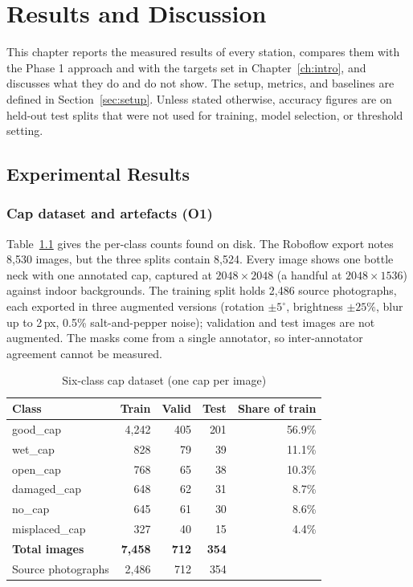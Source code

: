 \chapter{Results and Discussion}
\label{ch:results}

This chapter reports the measured results of every station, compares them with the Phase 1 approach and with the targets set in Chapter~\ref{ch:intro}, and discusses what they do and do not show. The setup, metrics, and baselines are defined in Section~\ref{sec:setup}. Unless stated otherwise, accuracy figures are on held-out test splits that were not used for training, model selection, or threshold setting.

\section{Experimental Results}
\label{sec:experimental-results}

\subsection{Cap dataset and artefacts (O1)}
\label{sec:res-o1}
Table~\ref{tab:capdata} gives the per-class counts found on disk. The Roboflow export notes 8,530 images, but the three splits contain 8,524. Every image shows one bottle neck with one annotated cap, captured at $2048{\times}2048$ (a handful at $2048{\times}1536$) against indoor backgrounds. The training split holds 2,486 source photographs, each exported in three augmented versions (rotation $\pm5^\circ$, brightness $\pm25\%$, blur up to 2\,px, 0.5\% salt-and-pepper noise); validation and test images are not augmented. The masks come from a single annotator, so inter-annotator agreement cannot be measured.

\begin{table}[htbp]
\centering
\caption{Six-class cap dataset (one cap per image)}
\label{tab:capdata}
\begin{tabular}{|l|r|r|r|r|}
\hline
\textbf{Class} & \textbf{Train} & \textbf{Valid} & \textbf{Test} & \textbf{Share of train} \\ \hline
good\_cap & 4,242 & 405 & 201 & 56.9\% \\ \hline
wet\_cap & 828 & 79 & 39 & 11.1\% \\ \hline
open\_cap & 768 & 65 & 38 & 10.3\% \\ \hline
damaged\_cap & 648 & 62 & 31 & 8.7\% \\ \hline
no\_cap & 645 & 61 & 30 & 8.6\% \\ \hline
misplaced\_cap & 327 & 40 & 15 & 4.4\% \\ \hline
\textbf{Total images} & \textbf{7,458} & \textbf{712} & \textbf{354} & \\ \hline
Source photographs & 2,486 & 712 & 354 & \\ \hline
\end{tabular}
\end{table}

